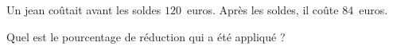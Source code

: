 
Un jean coûtait avant les soldes $120$~euros. Après les soldes, il coûte $84$~euros.

Quel est le pourcentage de réduction qui a été appliqué ?

\smallskip

